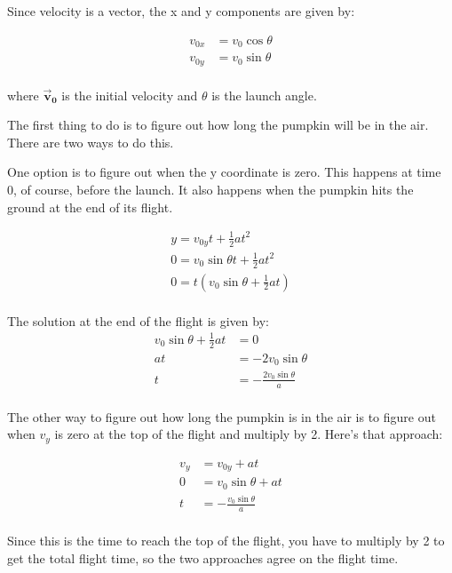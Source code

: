 \documentclass{exam}
\begin{document}
\begin{questions}
\begin{solution}

Since velocity is a vector, the x and y components are given by:

\begin{align*}
  v_{0x} &= v_0 \cos \theta \\
  v_{0y} &= v_0 \sin \theta \\
\end{align*}

where $\mathbf{\vec{v}_0}$ is the initial velocity and $\theta$ is the launch angle.

The first thing to do is to figure out how long the pumpkin will be in the air.  There are two ways to do this.

One option is to figure out when the y coordinate is zero.  This happens at time 0, of course, before the launch.  It
also happens when the pumpkin hits the ground at the end of its flight.

\begin{align*}
  y = v_{0y} t + \frac{1}{2} at^2 \\
  0 = v_0 \sin \theta t + \frac{1}{2} at^2 \\
  0 = t \left( v_0 \sin \theta + \frac{1}{2} at \right) \\
\end{align*}

The solution at the end of the flight is given by:
\begin{align*}
  v_0 \sin \theta + \frac{1}{2} at &= 0 \\
  at &= -2 v_0 \sin \theta \\
  t &= - \frac{2 v_0 \sin \theta}{a} \\
\end{align*}

The other way to figure out how long the pumpkin is in the air is to figure out when $v_y$ is zero at the top of the
flight and multiply by 2.  Here's that approach:

\begin{align*}
  v_y &= v_{0y} + at \\
  0 &= v_0 \sin \theta + at \\
  t &= - \frac{v_0 \sin \theta}{a} \\
\end{align*}

Since this is the time to reach the top of the flight, you have to multiply by 2 to get the total flight time, so the
two approaches agree on the flight time.


\end{solution}
\end{questions}
\end{document}

